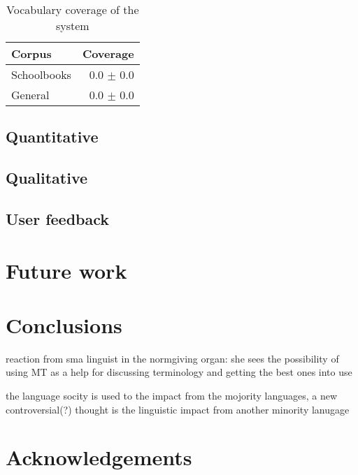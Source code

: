 \documentclass[a4paper,11pt,twocolumn]{article}
\begin{document}
\begin{table}
  \begin{center}
    \begin{tabular}{|l|r|}
      \hline
      \textbf{Corpus} & \textbf{Coverage}  \\
      \hline
      Schoolbooks     & 0.0 $\pm$ 0.0 \\
      General         & 0.0 $\pm$ 0.0 \\
      \hline
    \end{tabular}
    \label{table:coverage}
    \caption{Vocabulary coverage of the system}
  \end{center}
\end{table}

\subsection{Quantitative}
\subsection{Qualitative}

\subsection{User feedback}

\section{Future work}
\section{Conclusions}
\item reaction from sma linguist in the normgiving organ: she sees the possibility of using MT as a help for discussing terminology and getting the best ones into use
\item the language socity is used to the impact from the mojority languages, a new controversial(?) thought is the linguistic impact from another minority lanugage 


\section*{Acknowledgements}



\end{document}
